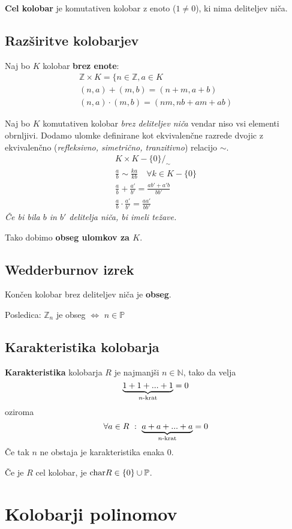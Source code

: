 	\textbf{Cel kolobar} je komutativen kolobar z enoto ($1\neq0$), ki nima deliteljev niča.

	\subsection*{Razširitve kolobarjev}
	Naj bo $K$ kolobar \textbf{brez enote}:
	\begin{gather*}
		\mathbb{Z} \times K = \{ n \in \mathbb{Z}, a \in K \\
		(n,a) + (m,b) = (n+m, a+b) \\
		(n,a) \cdot (m,b) = (nm, nb+am+ab)
	\end{gather*}

	Naj bo $K$ komutativen kolobar \emph{brez deliteljev niča} vendar niso vsi elementi obrnljivi. Dodamo ulomke definirane kot ekvivalenčne razrede dvojic z ekvivalenčno (\emph{refleksivno, simetrično, tranzitivno}) relacijo $\sim$.
	\begin{gather*}
		K \times K-\{0\} \Big/_\sim\\
		\frac{a}{b} \sim \frac{ka}{kb} \quad \forall k \in K-\{0\} \\
		\frac{a}{b} + \frac{a'}{b'} = \frac{ab' + a'b}{bb'}\\
		\frac{a}{b} \cdot \frac{a'}{b'} = \frac{aa'}{bb'}
	\end{gather*}
	\emph{Če bi bila $b$ in $b'$ delitelja niča, bi imeli težave.}

	Tako dobimo \textbf{obseg ulomkov za $K$}.

	\subsection*{Wedderburnov izrek}
	Končen kolobar brez deliteljev niča je \textbf{obseg}.

	Posledica:
	$\mathbb{Z}_n$ je obseg $\iff$ $n\in\mathbb{P}$

	\subsection*{Karakteristika kolobarja}
	\textbf{Karakteristika} kolobarja $R$ je najmanjši $n\in \mathbb{N}$, tako da velja 
	\[\underbrace{1+1+...+1}_{n\textmd{-krat}} = 0\]
	oziroma
	\[\forall a \in R\ :\ \underbrace{a+a+...+a}_{n\textmd{-krat}} = 0\]
	Če tak $n$ ne obstaja je karakteristika enaka $0$.

	Če je $R$ cel kolobar, je $\textmd{char}R \in \{0\} \cup \mathbb{P}$.


	\section{Kolobarji polinomov}
